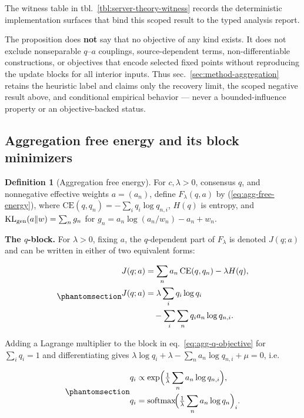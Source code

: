\documentclass[
  english,
]{article}
\theoremstyle{plain}
\theoremstyle{definition}
\newtheorem{definition}[theorem]{Definition}
\theoremstyle{remark}
\theoremstyle{definition}
\begin{document}
The witness table in tbl.~\ref{tbl:server-theory-witness} records the
deterministic implementation surfaces that bind this scoped result to
the typed analysis report.

The proposition does \textbf{not} say that no objective of any kind
exists. It does not exclude nonseparable \(q\)--\(a\) couplings,
source-dependent terms, non-differentiable constructions, or objectives
that encode selected fixed points without reproducing the update blocks
for all interior inputs. Thus sec.~\ref{sec:method-aggregation} retains
the heuristic label and claims only the recovery limit, the scoped
negative result above, and conditional empirical behavior --- never a
bounded-influence property or an objective-backed status.

\subsection{Aggregation free energy and its block
minimizers}\label{sec:supp-derivation}

\begin{definition}[Aggregation free energy]\label{def:aggregation-free-energy}
For \(c,\lambda>0\), consensus \(q\), and nonnegative effective weights
\(a=(a_n)\), define \(F_\lambda(q,a)\) by (\ref{eq:agg-free-energy}), where
\(\mathrm{CE}(q,q_n)=-\sum_i q_i\log q_{n,i}\), \(H(q)\) is entropy, and
\(\mathrm{KL}_{\rm gen}(a\|w)=\sum_n g_n\) for
\(g_n=a_n\log(a_n/w_n)-a_n+w_n\).
\end{definition}

\textbf{The \(q\)-block.} For \(\lambda>0\), fixing \(a\), the
\(q\)-dependent part of \(F_\lambda\) is denoted \(J(q;a)\) and can be
written in either of two equivalent forms:

\begin{equation}\protect\phantomsection\label{eq:agg-q-objective}{\begin{aligned}
J(q;a)
&=\sum_n a_n\,\mathrm{CE}(q,q_n)-\lambda H(q),\\
J(q;a)
&=\lambda\sum_i q_i\log q_i\\
&\quad-\sum_i\sum_n q_i a_n\log q_{n,i}.
\end{aligned}}\end{equation}

Adding a Lagrange multiplier to the block in
eq.~\ref{eq:agg-q-objective} for \(\sum_i q_i = 1\) and differentiating
gives \(\lambda\log q_i + \lambda - \sum_n a_n \log q_{n,i} + \mu = 0\),
i.e.

\begin{equation}\protect\phantomsection\label{eq:agg-q-min}{\begin{aligned}
q_i
&\propto \exp\!\Big(
  \tfrac{1}{\lambda}\sum_n a_n \log q_{n,i}\Big),\\
q_i
&= \mathrm{softmax}\!\Big(
  \tfrac{1}{\lambda}\sum_n a_n \log q_n\Big)_i.
\end{aligned}}\end{equation}
\end{document}
